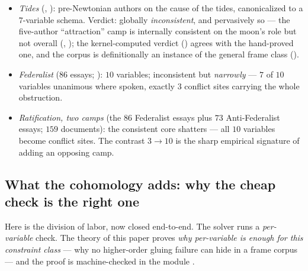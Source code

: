 \documentclass[11pt]{article}
\begin{document}
\begin{itemize}
\item \emph{Tides} (,
  ): pre-Newtonian authors on the cause of
  the tides, canonicalized to a $7$-variable schema.  Verdict:
  globally \emph{inconsistent}, and pervasively so --- the
  five-author ``attraction'' camp is internally consistent on the
  moon's role but not overall
  (,
  ); the kernel-computed
  verdict () agrees with the
  hand-proved one, and the corpus is definitionally an instance of
  the general frame class ().
\item \emph{Federalist} (86 essays; \citealp{hamilton1788federalist}):
  $10$ variables; inconsistent but \emph{narrowly} --- $7$ of $10$
  variables unanimous where spoken, exactly $3$ conflict sites
  carrying the whole obstruction.
\item \emph{Ratification, two camps} (the $86$ Federalist essays plus
  $73$ Anti-Federalist essays; $159$ documents): the consistent core
  shatters --- all $10$ variables become conflict sites.  The
  contrast $3 \to 10$ is the sharp empirical signature of adding an
  opposing camp.
\end{itemize}

\subsection{What the cohomology adds: why the cheap check is the
right one}
\label{sec:whycomplete}

Here is the division of labor, now closed end-to-end.  The solver
runs a \emph{per-variable} check.  The theory of this paper proves
\emph{why per-variable is enough for this constraint class} --- why
no higher-order gluing failure can hide in a frame corpus --- and
the proof is machine-checked in the module
.
\end{document}
